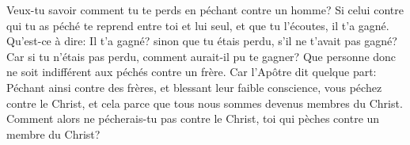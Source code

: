 Veux-tu savoir comment tu te perds en péchant contre un homme?
Si celui contre qui tu as péché te reprend entre toi et lui seul,
	et que tu l’écoutes, il t’a gagné.
Qu’est-ce à dire: Il t’a gagné?
	sinon que tu étais perdu, s’il ne t’avait pas gagné?
Car si tu n’étais pas perdu, comment aurait-il pu te gagner?
Que personne donc ne soit indifférent aux péchés contre un frère.
Car l’Apôtre dit quelque part:
	Péchant ainsi contre des frères, et blessant leur faible conscience,
	vous péchez contre le Christ,
	et cela parce que tous nous sommes devenus membres du Christ.
Comment alors ne pécherais-tu pas contre le Christ,
	toi qui pèches contre un membre du Christ?

